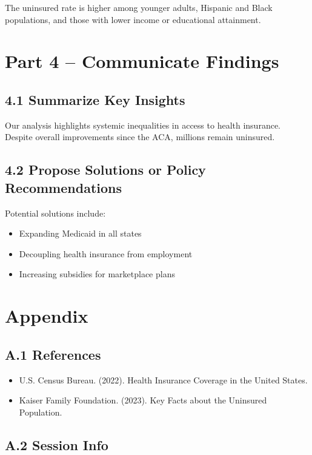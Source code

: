 \documentclass[
]{article}
\providecommand{\tightlist}{%
  \setlength{\itemsep}{0pt}\setlength{\parskip}{0pt}}
\begin{document}
The uninsured rate is higher among younger adults, Hispanic and Black
populations, and those with lower income or educational attainment.

\section{Part 4 -- Communicate
Findings}\label{part-4-communicate-findings}

\subsection{4.1 Summarize Key Insights}\label{summarize-key-insights}

Our analysis highlights systemic inequalities in access to health
insurance. Despite overall improvements since the ACA, millions remain
uninsured.

\subsection{4.2 Propose Solutions or Policy
Recommendations}\label{propose-solutions-or-policy-recommendations}

Potential solutions include:

\begin{itemize}
\tightlist
\item
  Expanding Medicaid in all states
\item
  Decoupling health insurance from employment
\item
  Increasing subsidies for marketplace plans
\end{itemize}

\section{Appendix}\label{appendix}

\subsection{A.1 References}\label{a.1-references}

\begin{itemize}
\tightlist
\item
  U.S. Census Bureau. (2022). Health Insurance Coverage in the United
  States.
\item
  Kaiser Family Foundation. (2023). Key Facts about the Uninsured
  Population.
\end{itemize}

\subsection{A.2 Session Info}\label{a.2-session-info}
\end{document}

